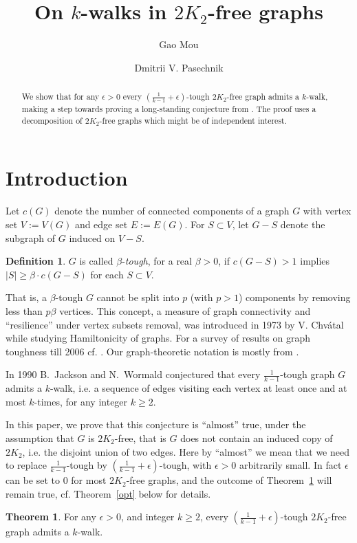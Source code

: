 \documentclass{amsart}
\theoremstyle{definition}
\newtheorem{theorem}{Theorem}
\newtheorem{definition}{Definition}
\newcommand{\ncc}{c}
\begin{document}
\author{Gao Mou}
\address{School of Physical and Mathematical Sciences, Nanyang Technological University, Singapore} 
\author{Dmitrii V. Pasechnik}
\address{Department of Computer Science, The University of Oxford, UK}

\title{On $k$-walks in $2K_2$-free graphs}
\begin{abstract}
We show that for any $\epsilon>0$ every $(\frac{1}{k-1}+\epsilon)$-tough
$2K_2$-free graph admits a $k$-walk, making a step towards proving a
long-standing conjecture from \cite{jackson1990k}. The proof uses a
decomposition of $2K_2$-free graphs which might be of independent interest.
\end{abstract}

\maketitle

\section{Introduction}

Let  $\ncc(G)$ denote the number of connected components of a graph $G$ with vertex set $V:=V(G)$ and edge set $E:=E(G)$. For $S\subset V$, let $G-S$ denote the subgraph of $G$ induced on $V-S$.
\begin{definition}
$G$ is called $\beta$-{\em tough},
for a real $\beta>0$, if $\ncc(G-S)>1$ implies $|S|\ge \beta\cdot \ncc(G-S)$ 
for each $S\subset V$.
\end{definition}
That is, a $\beta$-tough 
$G$ cannot be split into $p$ (with $p>1$) components by removing less than
$p\beta$ vertices.  
This concept, a measure of graph connectivity and ``resilience'' under vertex subsets removal,
was introduced in 1973 by V. Chv\'{a}tal 
while studying   Hamiltonicity of graphs. For a survey of results on graph toughness till 2006
cf. \cite{MR2221006}. Our graph-theoretic notation is mostly from \cite{bomu08}.

In 1990 B.~Jackson and N.~Wormald conjectured \cite{jackson1990k} that every
$\frac{1}{k-1}$-tough graph $G$ admits a $k$-walk, i.e. a sequence of edges
visiting each vertex at least once and at most $k$-times, for any integer $k\ge2$. 

In this paper, we prove that this conjecture is ``almost'' true, under the
assumption that $G$ is  $2K_2$-free, that is $G$ does not contain an induced
copy of $2K_2$, i.e. the disjoint union of two edges.  Here by ``almost'' we
mean that we need to replace $\frac{1}{k-1}$-tough by
$(\frac{1}{k-1}+\epsilon)$-tough, with $\epsilon>0$ arbitrarily small.  In fact
$\epsilon$ can be set to 0 for most $2K_2$-free graphs, and the outcome of
Theorem~\ref{thm2} will remain true, cf. Theorem~\ref{opt} below for details.
\begin{theorem}\label{thm2} 
For any $\epsilon>0$, and integer $k\ge2$, every
$(\frac{1}{k-1}+\epsilon)$-tough $2K_2$-free graph admits a $k$-walk.
\end{theorem}
\end{document}
